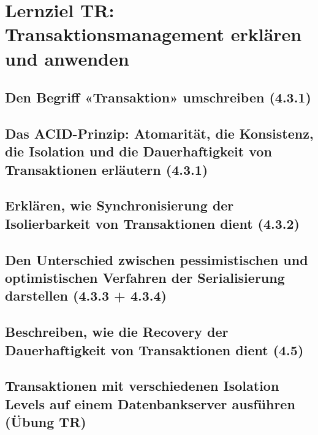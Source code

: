 \section{Lernziel TR: Transaktionsmanagement erklären und anwenden}

\subsection{Den Begriff «Transaktion» umschreiben (4.3.1)}

\subsection{Das ACID-Prinzip: Atomarität, die Konsistenz, die Isolation und die Dauerhaftigkeit von Transaktionen erläutern (4.3.1)}

\subsection{Erklären, wie Synchronisierung der Isolierbarkeit von Transaktionen dient (4.3.2)}

\subsection{Den Unterschied zwischen pessimistischen und optimistischen Verfahren der Serialisierung darstellen (4.3.3 + 4.3.4)}

\subsection{Beschreiben, wie die Recovery der Dauerhaftigkeit von Transaktionen dient (4.5)}

\subsection{Transaktionen mit verschiedenen Isolation Levels auf einem Datenbankserver ausführen (Übung TR)}